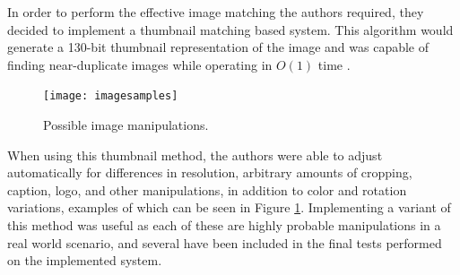 In order to perform the effective image matching the authors required, they decided to implement a thumbnail matching based system. This algorithm would generate a 130-bit thumbnail representation of the image and was capable of finding near-duplicate images while operating in $O(1)$ time \cite{Srinivasan:2008}.

\begin{figure}[htbp]
\centering
\texttt{[image: imagesamples]}
\caption{Possible image manipulations.}
\label{imgsample}
\end{figure}

When using this thumbnail method, the authors were able to adjust automatically for differences in resolution, arbitrary amounts of cropping, caption, logo, and other manipulations, in addition to color and rotation variations, examples of which can be seen in Figure \ref{imgsample}. Implementing a variant of this method was useful as each of these are highly probable manipulations in a real world scenario, and several have been included in the final tests performed on the implemented system.

